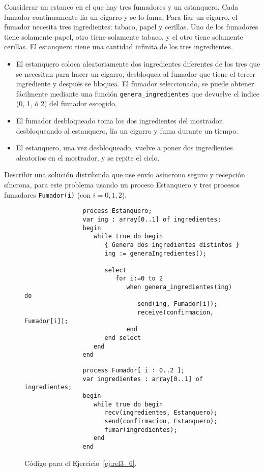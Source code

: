 \begin{ejercicio}\label{ej:rel3_6}
    Considerar un estanco en el que hay tres fumadores y un estanquero. Cada fumador continuamente lía un cigarro y se lo fuma. Para liar un cigarro, el fumador necesita tres ingredientes: tabaco, papel y cerillas. Uno de los fumadores tiene solamente papel, otro tiene solamente tabaco, y el otro tiene solamente cerillas. El estanquero tiene una cantidad infinita de los tres ingredientes.
    \begin{itemize}
        \item El estanquero coloca aleatoriamente dos ingredientes diferentes de los tres que se necesitan para hacer un cigarro, desbloquea al fumador que tiene el tercer ingrediente y después se bloquea. El fumador seleccionado, se puede obtener fácilmente mediante una función \verb|genera_ingredientes| que devuelve el índice (0, 1, ó 2) del fumador escogido.
        \item El fumador desbloqueado toma los dos ingredientes del mostrador, desbloqueando al estanquero, lía un cigarro y fuma durante un tiempo.
        \item El estanquero, una vez desbloqueado, vuelve a poner dos ingredientes aleatorios en el mostrador, y se repite el ciclo.
    \end{itemize}
    Describir una solución distribuida que use envío asíncrono seguro y recepción síncrona, para este problema usando un proceso Estanquero y tres procesos fumadores \verb|Fumador(i)| (con $i=0, 1, 2$).

    \begin{figure}[H]
        \centering
            \begin{verbatim}
                process Estanquero;
                var ing : array[0..1] of ingredientes;
                begin
                   while true do begin
                      { Genera dos ingredientes distintos }
                      ing := generaIngredientes();

                      select
                         for i:=0 to 2
                            when genera_ingredientes(ing) do
                               send(ing, Fumador[i]);
                               receive(confirmacion, Fumador[i]);
                            end
                      end select
                   end
                end
            \end{verbatim}
            \begin{verbatim}
                process Fumador[ i : 0..2 ];
                var ingredientes : array[0..1] of ingredientes;
                begin
                   while true do begin
                      recv(ingredientes, Estanquero);
                      send(confirmacion, Estanquero);
                      fumar(ingredientes);
                   end
                end
            \end{verbatim}
        \caption{Código para el Ejercicio~\ref{ej:rel3_6}.}
        \label{fig:cod_6}
    \end{figure}
\end{ejercicio}

